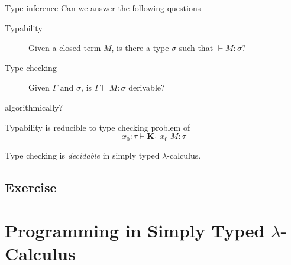 \begin{frame}{Type inference}
  Can we answer the following questions
  \begin{description}
    \item[Typability] Given a closed term $M$, is there a type $\sigma$
      such that $\vdash M : \sigma$? 
    \item[Type checking] Given $\Gamma$ and $\sigma$, is $\Gamma \vdash M : \sigma$ derivable?
  \end{description}
  algorithmically?
  
  Typability is reducible to type checking problem of
  \[
    x_0: \tau \vdash \textbf{K}_1\;x_0\;M : \tau
  \]

  \begin{theorem}
    Type checking is \emph{decidable}
    in simply typed $\lambda$-calculus.
  \end{theorem}
\subsection*{Exercise}
  
\end{frame}

\section{Programming in Simply Typed $\lambda$-Calculus}


